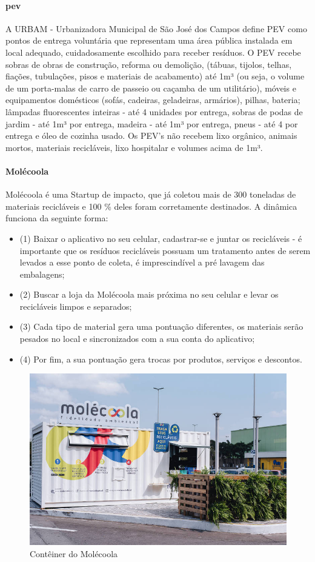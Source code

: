 \paragraph{\textbf{\gls{pev}}}
A URBAM - Urbanizadora Municipal de São José dos Campos define PEV como pontos de entrega voluntária que representam uma área pública instalada em local adequado, cuidadosamente escolhido para receber resíduos. O PEV recebe sobras de obras de construção, reforma ou demolição, (tábuas, tijolos, telhas, fiações, tubulações, pisos e materiais de acabamento) até 1m³ (ou seja, o volume de um porta-malas de carro de passeio ou caçamba de um utilitário), móveis e equipamentos domésticos (sofás, cadeiras, geladeiras, armários), pilhas, bateria; lâmpadas fluorescentes inteiras - até 4 unidades por entrega, sobras de podas de jardim - até 1m³ por entrega, madeira - até 1m³ por entrega, pneus - até 4 por entrega e óleo de cozinha usado. Os PEV’s não recebem lixo orgânico, animais mortos, materiais recicláveis, lixo hospitalar e volumes acima de 1m³.

\paragraph{\textbf{Molécoola}}
Molécoola é uma Startup de impacto, que já coletou mais de 300 toneladas de materiais recicláveis e 100 \% deles foram corretamente destinados. A dinâmica funciona da seguinte forma: 
\begin{itemize}
	\item (1) Baixar o aplicativo no seu celular, cadastrar-se e juntar os recicláveis - é importante que os resíduos recicláveis possuam um tratamento antes de serem levados a esse ponto de coleta, é imprescindível a pré lavagem das embalagens;
	\item (2) Buscar a loja da Molécoola mais próxima no seu celular e levar os recicláveis limpos e separados; 
	\item (3) Cada tipo de material gera uma pontuação diferentes, os materiais serão pesados no local e sincronizados com a sua conta do aplicativo;
	\item (4) Por fim, a sua pontuação gera trocas por produtos, serviços e descontos.
\end{itemize}


\begin{figure}
	\centering
	\includegraphics[width=0.7\linewidth]{produtos/prodquatro/molecoola}
	\caption{Contêiner do Molécoola}
	\label{fig:molecoola}
\end{figure}
\FloatBarrier


